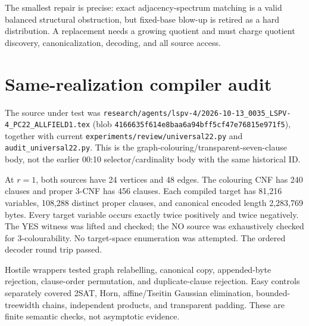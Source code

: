 \documentclass[11pt]{article}
\begin{document}
The smallest repair is precise: exact adjacency-spectrum matching is a valid balanced
structural obstruction, but fixed-base blow-up is retired as a hard distribution.  A
replacement needs a growing quotient and must charge quotient discovery,
canonicalization, decoding, and all source access.

\section{Same-realization compiler audit}
The source under test was
\texttt{research/agents/lspv-4/2026-10-13\_0035\_LSPV-4\_PC22\_ALLFIELD1.tex}
(blob \texttt{4166635f614e8baa6a94bff5cf47e76815e971f5}), together with current
\texttt{experiments/review/universal22.py} and \texttt{audit\_universal22.py}.  This is
the graph-colouring/transparent-seven-clause body, not the earlier 00:10
selector/cardinality body with the same historical ID.

At $r=1$, both sources have 24 vertices and 48 edges.  The colouring CNF has 240
clauses and proper 3-CNF has 456 clauses.  Each compiled target has 81,216 variables,
108,288 distinct proper clauses, and canonical encoded length 2,283,769 bytes.  Every
target variable occurs exactly twice positively and twice negatively.  The YES witness
was lifted and checked; the NO source was exhaustively checked for 3-colourability.
No target-space enumeration was attempted.  The ordered decoder round trip passed.

Hostile wrappers tested graph relabelling, canonical copy, appended-byte rejection,
clause-order permutation, and duplicate-clause rejection.  Easy controls separately
covered 2SAT, Horn, affine/Tseitin Gaussian elimination, bounded-treewidth chains,
independent products, and transparent padding.  These are finite semantic checks, not
asymptotic evidence.
\end{document}
